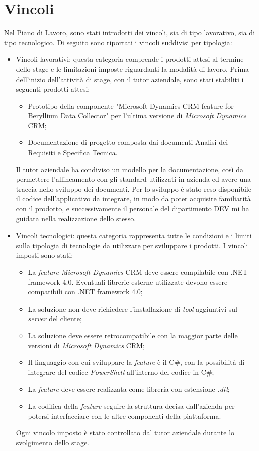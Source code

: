 \section{Vincoli}
Nel Piano di Lavoro, sono stati introdotti dei vincoli, sia di tipo lavorativo, sia di tipo tecnologico. 
Di seguito sono riportati i vincoli suddivisi per tipologia:
\begin{itemize}
    \item Vincoli lavorativi: questa categoria comprende i prodotti attesi al termine dello stage e le limitazioni imposte riguardanti la modalità di lavoro. Prima dell’inizio dell’attività di stage, con il tutor aziendale, sono stati stabiliti i seguenti prodotti attesi:
    \begin{itemize}
        \item Prototipo della componente "Microsoft Dynamics CRM
        feature for Beryllium Data Collector" per l’ultima versione di \emph{Microsoft Dynamics} CRM;
        \item Documentazione di progetto composta dai documenti Analisi dei Requisiti e Specifica Tecnica.
        \end{itemize}
Il tutor aziendale ha condiviso un modello per la documentazione, così da permettere l'allineamento con gli standard utilizzati in azienda ed avere una traccia nello sviluppo dei documenti. Per lo sviluppo è stato reso disponibile il codice dell’applicativo da integrare, in modo da poter acquisire familiarità con il prodotto, e successivamente il personale del dipartimento DEV mi ha guidata nella realizzazione dello stesso.

\item Vincoli tecnologici: questa categoria rappresenta tutte le condizioni e i limiti sulla tipologia di tecnologie da utilizzare per sviluppare i prodotti.
I vincoli imposti sono stati:
\begin{itemize}
    \item La \emph{feature Microsoft Dynamics} CRM deve essere compilabile con .NET framework 4.0. Eventuali librerie esterne utilizzate devono essere compatibili con .NET framework 4.0;
    \item La soluzione non deve richiedere l’installazione di \emph{tool} aggiuntivi sul \emph{server} del cliente;
    \item La soluzione deve essere retrocompatibile con la maggior parte delle versioni di \emph{Microsoft Dynamics} CRM;
    \item Il linguaggio con cui sviluppare la \emph{feature} è il C\#, con la possibilità di integrare del codice \emph{PowerShell} all’interno del codice in C\#;
    \item La \emph{feature} deve essere realizzata come libreria con estensione \emph{.dll};
    \item La codifica della \emph{feature} seguire la struttura decisa dall’azienda per potersi interfacciare con le altre componenti della piattaforma.
\end{itemize}
Ogni vincolo imposto è stato controllato dal tutor aziendale durante lo svolgimento dello stage.

\end{itemize}
